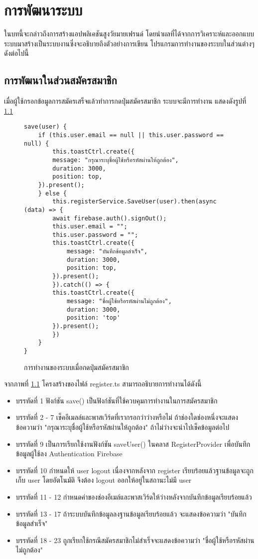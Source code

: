 \chapter{การพัฒนาระบบ}
ในบทนี้จะกล่าวถึงการสร้างแอปพลิเคชันสูงวัยมายเฟรนด์ โดยนำผลที่ได้จากการวิเคราะห์และออกแบบระบบมาสร้างเป็นระบบงานซึ่งจะอธิบายถึงตัวอย่างการเขียน โปรแกรมการทำงานของระบบในส่วนต่างๆดังต่อไปนี้

\section{การพัฒนาในส่วนสมัครสมาชิก}
เมื่อผู้ใช้กรอกข้อมูลการสมัครเสร็จแล้วทำการกดปุ่มสมัครสมาชิก ระบบจะมีการทำงาน แสดงดังรูปที่ \ref{Fig:4-Register}
\begin{figure}[H]
{\lstset{language=Pascal}
\begin{lstlisting}
save(user) {
	if (this.user.email == null || this.user.password == null) {
		this.toastCtrl.create({
		message: "กรุณาระบุชื่อผู้ใช้หรือรหัสผ่านให้ถูกต้อง",
		duration: 3000,
		position: top,
	}).present();
	} else {
		this.registerService.SaveUser(user).then(async (data) => {
		await firebase.auth().signOut();
		this.user.email = "";
		this.user.password = "";
		this.toastCtrl.create({
			message: "บันทึกข้อมูลสำเร็จ",
			duration: 3000,
			position: top,
		}).present();
		}).catch(() => {
		this.toastCtrl.create({
			message: "ชื่อผู้ใช้หรือรหัสผ่านไม่ถูกต้อง",
			duration: 3000,
			position: 'top'
		}).present();
		})
	}
}
\end{lstlisting}}
\caption{การทำงานของระบบเมื่อกดปุ่มสมัครสมาชิก}
\label{Fig:4-Register}
\end{figure}
\newpage
จากภาพที่ \ref{Fig:4-Register} โครงสร้างของไฟล์ register.ts สามารถอธิบายการทำงานได้ดังนี้
\begin{itemize}[label={--}]
\item บรรทัดที่ 1 ฟังก์ชัน save() เป็นฟังก์ชันที่ใช้ควบคุมการทำงานในการสมัครสมาชิก
\item บรรทัดที่ 2 - 7 เช็คอีเมลล์และพาสเวิร์ดที่เรากรอกว่าว่างหรือไม่ ถ้าช่องใดช่องหนึ่งจะแสดงข้อความว่า "กรุณาระบุชื่อผู้ใช้หรือรหัสผ่านให้ถูกต้อง" ถ้าไม่ว่างจะนำไปเช็คข้อมูลต่อไป
\item บรรทัดที่ 9 เป็นการเรียกใช้งานฟังก์ชัน saveUser() ในคลาส RegisterProvider เพื่อบันทึกข้อมูลผู้ใช้ลง Authentication Firebase 
\item บรรทัดที่ 10 กำหนดให้ user logout เนื่องจากหลังจาก register เรียบร้อยแล้วฐานข้อมูลจะถูกเก็บ user โดยอัตโนมัติ จึงต้อง logout ออกให้อยู่ในสถานะไม่มี user
\item บรรทัดที่ 11 - 12 กำหนดค่าของช่องอีเมล์และพาสเวิร์ดให้ว่างหลังจากบันทึกข้อมูลเรียบร้อยแล้ว
\item บรรทัดที่ 13 - 17 ถ้าระบบบันทึกข้อมูลลงฐานข้อมูลเรียบร้อยแล้ว จะแสดงข้อความว่า "บันทึกข้อมูลสำเร็จ"
\item บรรทัดที่ 18 - 23 ถูกเรียกใช้กรณีสมัครสมาชิกไม่สำเร็จจะแสดงข้อความว่า "ชื่อผู้ใช้หรือรหัสผ่านไม่ถูกต้อง"
\end{itemize}
\newpage

